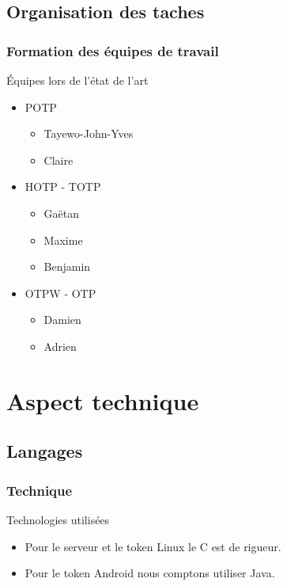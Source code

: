 \documentclass[xcolor=table]{beamer}
\begin{document}
\subsection{Organisation des taches}
\begin{frame}
\frametitle{Formation des équipes de travail}
\begin{block}{Équipes lors de l'état de l'art}
  \begin{itemize}
    \item POTP
    \begin{itemize}
      \item Tayewo-John-Yves 
      \item Claire 
    \end{itemize}
    \item HOTP - TOTP
    \begin{itemize}
      \item Gaëtan 
      \item Maxime 
      \item Benjamin 
    \end{itemize}
    \item OTPW - OTP
    \begin{itemize}
      \item Damien 
      \item Adrien 
    \end{itemize}
  \end{itemize}
\end{block}
\end{frame}



\section{Aspect technique}

\subsection{Langages}
\begin{frame}
\frametitle{Technique}
\begin{block}{Technologies utilisées}
\begin{itemize}
  \item Pour le serveur et le token Linux le C est de rigueur.
  \item Pour le token Android nous comptons utiliser Java. 
\end{itemize}
\end{block}
\end{frame}
\end{document}
